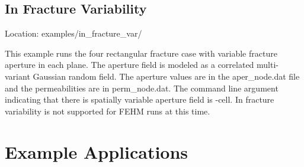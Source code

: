 \documentclass[letterpaper,10pt,english]{sphinxmanual}
\begin{document}
\section{In Fracture Variability}
\label{\detokenize{examples:in-fracture-variability}}
Location: examples/in\_fracture\_var/

This example runs the four rectangular fracture case with variable fracture aperture in each plane. The aperture field is modeled as a correlated multi-variant Gaussian random field. The aperture values are in the aper\_node.dat file and the permeabilities are in perm\_node.dat. The command line argument indicating that there is spatially variable aperture field is -cell.  In fracture variability is not supported for FEHM runs at this time.

\begin{figure}[htbp]
\centering
\capstart

\noindent{}
\caption{}\label{\detokenize{examples:id11}}\end{figure}

\begin{figure}[htbp]
\centering
\capstart

\noindent{}
\caption{}\label{\detokenize{examples:id12}}\end{figure}


\chapter{Example Applications}
\label{\detokenize{applications:example-applications}}\label{\detokenize{applications::doc}}
\end{document}
